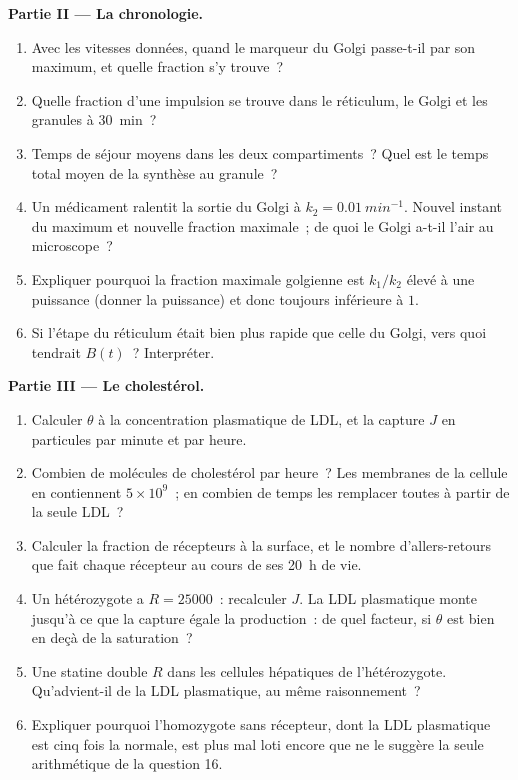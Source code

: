\begin{problem}
\medskip
\noindent\textbf{Partie II --- La chronologie.}
\begin{enumerate}[resume]
  \item Avec les vitesses données, quand le marqueur du Golgi passe-t-il
        par son maximum, et quelle fraction s'y trouve~?
  \item Quelle fraction d'une impulsion se trouve dans le réticulum, le
        Golgi et les granules à \qty{30}{min}~?
  \item Temps de séjour moyens dans les deux compartiments~? Quel est
        le temps total moyen de la synthèse au granule~?
  \item Un médicament ralentit la sortie du Golgi à
        $k_{2} = \qty{0.01}{min^{-1}}$. Nouvel instant du maximum et
        nouvelle fraction maximale~; de quoi le Golgi a-t-il l'air au
        microscope~?
  \item Expliquer pourquoi la fraction maximale golgienne est
        $k_{1}/k_{2}$ élevé à une puissance (donner la puissance) et
        donc toujours inférieure à $1$.
  \item Si l'étape du réticulum était bien plus rapide que celle du
        Golgi, vers quoi tendrait $B(t)$~? Interpréter.
\end{enumerate}

\medskip
\noindent\textbf{Partie III --- Le cholestérol.}
\begin{enumerate}[resume]
  \item Calculer $\theta$ à la concentration plasmatique de LDL, et la
        capture $J$ en particules par minute et par heure.
  \item Combien de molécules de cholestérol par heure~? Les membranes
        de la cellule en contiennent $5\times 10^{9}$~; en combien de
        temps les remplacer toutes à partir de la seule LDL~?
  \item Calculer la fraction de récepteurs à la surface, et le nombre
        d'allers-retours que fait chaque récepteur au cours de ses
        \qty{20}{h} de vie.
  \item Un hétérozygote a $R = \num{25000}$~: recalculer $J$. La LDL
        plasmatique monte jusqu'à ce que la capture égale la
        production~: de quel facteur, si $\theta$ est bien en deçà de
        la saturation~?
  \item Une statine double $R$ dans les cellules hépatiques de
        l'hétérozygote. Qu'advient-il de la LDL plasmatique, au même
        raisonnement~?
  \item Expliquer pourquoi l'homozygote sans récepteur, dont la LDL
        plasmatique est cinq fois la normale, est plus mal loti encore
        que ne le suggère la seule arithmétique de la question 16.
\end{enumerate}


\end{problem}
